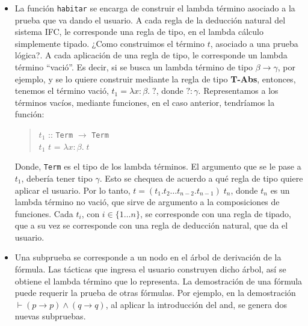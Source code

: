 \documentclass[a4paper,11pt]{article}
\theoremstyle{definition}
\begin{document}
\begin{itemize}
  \item La función \texttt{habitar} se encarga de construir el lambda término asociado a la prueba que va dando el usuario.
  A cada regla de la deducción natural del sistema IFC, le corresponde una regla de tipo, en el lambda cálculo simplemente
  tipado. ¿Como construimos el término $t$, asociado a una prueba lógica?.
  A cada aplicación de una regla de tipo, le corresponde un lambda término ``vació''.
  Es decir, si se busca un lambda término de tipo $\beta \rightarrow \gamma$, por ejemplo, y se lo quiere construir mediante la regla 
  de tipo \textbf{T-Abs}, entonces, tenemos el término vació, $t_{1} = \lambda x:\beta. \; ?$, donde $? : \gamma$.
  Representamos a los términos vacíos, mediante funciones, en el caso anterior, tendríamos la función:

  \begin{verse}
  $t_{1}$ :: \texttt{Term} $\rightarrow$  \texttt{Term} \\
  $t_{1}$ $t$ = $\lambda x:\beta. \; t$
  \end{verse}

  Donde, \texttt{Term} es el tipo de los lambda términos. El argumento que se le pase a $t_{1}$, debería tener tipo $\gamma$.
  Esto se chequea de acuerdo a qué regla de tipo quiere aplicar el usuario.
  Por lo tanto, $t = (t_{1} . t_{2} \dots t_{n-2} . t_{n-1}) \; t_{n}$, donde $t_{n}$ es un lambda término no vació, que sirve de argumento a la composiciones
  de funciones. Cada $t_{i}$, con $i \in \{ 1 \dots n \}$, se corresponde con una regla de tipado, que a su vez se corresponde con una regla de deducción natural, 
  que da el usuario.
  
  \item Una subprueba se corresponde a un nodo en el árbol de derivación de la fórmula. Las tácticas que ingresa el usuario construyen dicho árbol,
  así se obtiene el lambda término que lo representa. La demostración de una fórmula puede requerir la prueba de otras fórmulas. Por ejemplo,
  en la demostración $\vdash (p \rightarrow p) \wedge (q \rightarrow q)$, al aplicar la introducción del and, se genera dos nuevas subpruebas.
  
  

\end{itemize}
\end{document}
